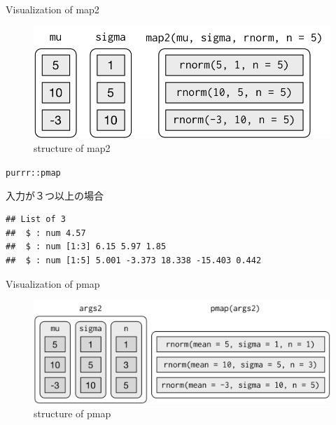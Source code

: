 \documentclass[ignorenonframetext,]{beamer}
\newenvironment{Shaded}{\begin{snugshade}}{\end{snugshade}}
\newcommand{\KeywordTok}[1]{\textcolor[rgb]{0.13,0.29,0.53}{\textbf{#1}}}
\newcommand{\DataTypeTok}[1]{\textcolor[rgb]{0.13,0.29,0.53}{#1}}
\newcommand{\DecValTok}[1]{\textcolor[rgb]{0.00,0.00,0.81}{#1}}
\newcommand{\StringTok}[1]{\textcolor[rgb]{0.31,0.60,0.02}{#1}}
\newcommand{\OperatorTok}[1]{\textcolor[rgb]{0.81,0.36,0.00}{\textbf{#1}}}
\newcommand{\NormalTok}[1]{#1}
\begin{document}
\begin{frame}{Visualization of map2}

\begin{figure}
\centering
\includegraphics{../img/lists-map2.png}
\caption{structure of map2}
\end{figure}

\end{frame}

\begin{frame}[fragile]{\texttt{purrr::pmap}}

入力が３つ以上の場合

\begin{Shaded}
\end{Shaded}

\begin{verbatim}
## List of 3
##  $ : num 4.57
##  $ : num [1:3] 6.15 5.97 1.85
##  $ : num [1:5] 5.001 -3.373 18.338 -15.403 0.442
\end{verbatim}

\end{frame}

\begin{frame}{Visualization of pmap}

\begin{figure}
\centering
\includegraphics{../img/lists-pmap-named.png}
\caption{structure of pmap}
\end{figure}

\end{frame}
\end{document}
